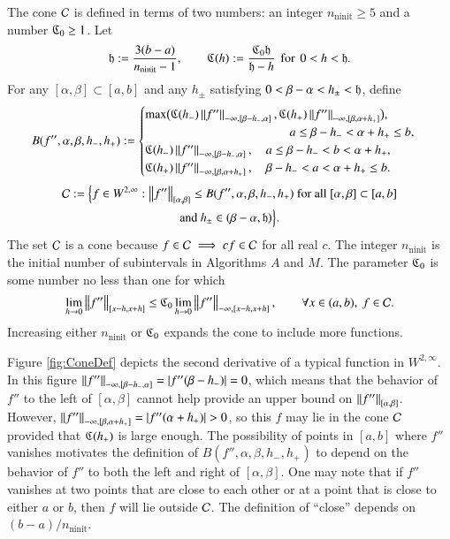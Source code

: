 \documentclass[review]{elsarticle}
\theoremstyle{definition}
\renewcommand{\cw}{W}
\newenvironment{FJHchange}{}{} %
\DeclareMathOperator{\ninit}{ninit}
\begin{document}
The cone $\cc$ is defined in terms of two numbers: an integer $n_{\ninit} \ge 5$
and a  number $\fC_0 \ge 1$. Let
\begin{equation}
\label{hCdef}
\fh := \frac{3(b-a)}{n_{\ninit}-1}, \qquad \fC(h) := \frac{\fC_0 \fh}{\fh - h}
\mbox{\, for \,} 0<h<\fh.
\end{equation}
For any $[\alpha, \beta] \subset [a,b]$ and any $h_{\pm}$ satisfying $0 <
\beta - \alpha < h_{\pm} < \fh$, define
\begin{equation} \label{tbdef}
B(f'',\alpha,\beta,h_-,h_+) :=
\begin{cases}
   \max\bigl(\fC(h_{-}) \norm[-\infty,{[\beta-h_-,\alpha]}]{f''},\fC(h_{+})
   \norm[-\infty,{[\beta, \alpha+h_+]}]{f''}\bigr),
\\                                             \hspace{26ex} a \le \beta- h_- <  \alpha + h_+ \le b,
\\ \fC(h_{-}) \norm[-\infty,{[\beta-h_-,\alpha]}]{f''},  \quad a \le \beta- h_- < b< \alpha + h_+,
\\ \fC(h_{+}) \norm[-\infty,{[\beta, \alpha+h_+]}]{f''},
\quad \beta- h_- <  a  < \alpha + h_+ \le b.
\end{cases}
\end{equation}
\begin{multline} \label{conedef}
 \cc := \Bigl \{
 f  \in    \cw^{2,\infty}:   \norm[{[\alpha,\beta]}]{f''}  \le B(f'',\alpha,\beta,h_-,h_+)
 \text{ for all } [\alpha,\beta] \subset [a,b]
\\ \text{and } h_{\pm} \in (\beta - \alpha,  \fh)  \Bigr \}.
\end{multline}
The set $\cc$ is a cone because $f \in \cc \implies cf \in \cc$ for all real
$c$. The integer $n_{\ninit}$ is the initial number of subintervals in
Algorithms $A$ and $M$. \begin{FJHchange}The parameter $\fC_0$ is some number 
no less 
than one for 
which
\[
\lim_{h \to 0} \norm[{[x-h,x+h]}]{f''} \le 
\fC_0 \lim_{h \to 0} \norm[-\infty,{[x-h,x+h]}]{f''}, \qquad \forall x \in (a,b), \ f \in \cc.
\]\end{FJHchange}
Increasing either $n_{\ninit}$ or $\fC_0$ expands the cone to
include more functions.

Figure \ref{fig:ConeDef} depicts the second derivative of a typical function in
$\cw^{2,\infty}$.  In this figure
$\norm[-\infty,{[\beta-h_-,\alpha]}]{f''} = \abs{f''(\beta - h_-)} = 0$, which means that the
behavior of $f''$ to the left of $[\alpha,\beta]$ cannot help provide an upper bound on $
\norm[{[\alpha,\beta]}]{f''}$.  However, $\norm[-\infty,{[\beta,\alpha+h_+]}]{f''} =
\abs{f''(\alpha + h_+)} > 0$, so this $f$ may lie in the cone $\cc$ provided that
$\fC(h_+)$ is large enough.  The possibility of points in $[a,b]$ where $f''$ vanishes
motivates the definition of $B(f'',\alpha,\beta,h_-,h_+)$ to depend on the behavior of $f''$
to both the left and right of $[\alpha,\beta]$.  One may note that if $f''$ vanishes at two
points that are close to each other or at a point that is close to either $a$ or $b$, then
$f$ will lie outside $\cc$.  The definition of ``close'' depends on
$(b-a)/n_{\ninit}$.
\end{document}
